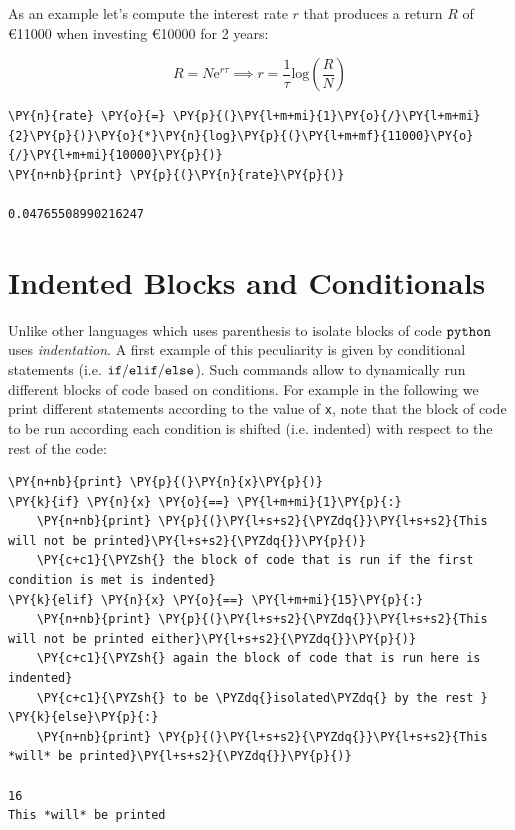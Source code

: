 As an example let's compute the interest rate \(r\) that produces a return \(R\) of 
\euro 11000 when investing \euro 10000 for 2 years:

\[R = N\mathrm{e}^{r\tau} \implies r = \frac{1}{\tau} \mathrm{log}(\frac{R}{N})\]

\begin{codebox}[breakable, size=fbox, boxrule=1pt, pad at break*=1mm, colback=cellbackground, colframe=cellborder]            
\begin{Verbatim}[commandchars=\\\{\}]
\PY{n}{rate} \PY{o}{=} \PY{p}{(}\PY{l+m+mi}{1}\PY{o}{/}\PY{l+m+mi}{2}\PY{p}{)}\PY{o}{*}\PY{n}{log}\PY{p}{(}\PY{l+m+mf}{11000}\PY{o}{/}\PY{l+m+mi}{10000}\PY{p}{)}
\PY{n+nb}{print} \PY{p}{(}\PY{n}{rate}\PY{p}{)}

0.04765508990216247
\end{Verbatim}
\end{codebox}

\section{Indented Blocks and Conditionals}
\label{indented-blocks-and-the-ttifelse-statement}

Unlike other languages which uses parenthesis to isolate blocks of code $\tt{python}$ 
uses \emph{indentation}. A first example of this peculiarity is given by conditional statements 
(i.e. $\tt{if/elif/else}$). Such commands allow to dynamically run different blocks of code 
based on conditions. For example in the following we print different statements according to 
the value of \texttt{x}, note that the block of code to be run according each condition 
is shifted (i.e. indented) with respect to the rest of the code:

\begin{codebox}[breakable, size=fbox, boxrule=1pt, pad at break*=1mm, colback=cellbackground, colframe=cellborder]            
\begin{Verbatim}[commandchars=\\\{\}]
\PY{n+nb}{print} \PY{p}{(}\PY{n}{x}\PY{p}{)}
\PY{k}{if} \PY{n}{x} \PY{o}{==} \PY{l+m+mi}{1}\PY{p}{:} 
    \PY{n+nb}{print} \PY{p}{(}\PY{l+s+s2}{\PYZdq{}}\PY{l+s+s2}{This will not be printed}\PY{l+s+s2}{\PYZdq{}}\PY{p}{)} 
    \PY{c+c1}{\PYZsh{} the block of code that is run if the first condition is met is indented}
\PY{k}{elif} \PY{n}{x} \PY{o}{==} \PY{l+m+mi}{15}\PY{p}{:}
    \PY{n+nb}{print} \PY{p}{(}\PY{l+s+s2}{\PYZdq{}}\PY{l+s+s2}{This will not be printed either}\PY{l+s+s2}{\PYZdq{}}\PY{p}{)}
    \PY{c+c1}{\PYZsh{} again the block of code that is run here is indented}
    \PY{c+c1}{\PYZsh{} to be \PYZdq{}isolated\PYZdq{} by the rest }
\PY{k}{else}\PY{p}{:}
    \PY{n+nb}{print} \PY{p}{(}\PY{l+s+s2}{\PYZdq{}}\PY{l+s+s2}{This *will* be printed}\PY{l+s+s2}{\PYZdq{}}\PY{p}{)}

16
This *will* be printed
\end{Verbatim}
\end{codebox}

